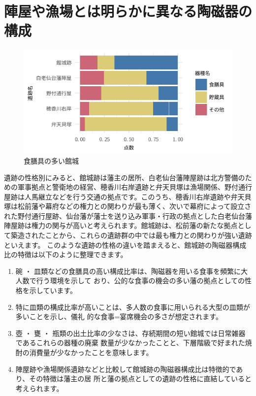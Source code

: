 \documentclass[11pt,report]{jsbook}
\begin{document}
\section{陣屋や漁場とは明らかに異なる陶磁器の構成}

\begin{figure}
\vspace*{-\intextsep} 
\centering
\includegraphics[width=80truemm]{fig/16.pdf}
\caption{食膳具の多い館城}
\label{fig16}
\end{figure}

遺跡の性格別にみると、館城跡は藩主の居所、白老仙台藩陣屋跡は北方警備のための軍事拠点と警衛地の経営、穂香川右岸遺跡と弁天貝塚は漁場関係、野付通行屋跡は人馬継立などを行う交通の拠点です。このうち、穂香川右岸遺跡や弁天貝塚は松前藩や幕府などの権力との関わりが最も薄く、次いで幕府によって設立された野付通行屋跡、仙台藩が藩士を送り込み軍事・行政の拠点とした白老仙台藩陣屋跡は権力の関与が高いと考えられます。館城跡は、松前藩の新たな拠点として築造されたことから、これらの遺跡群の中では最も権力との関わりが強い遺跡といえます。
このような遺跡の性格の違いを踏まえると、館城跡の陶磁器構成比の特徴は以下のように整理できます。

\begin{enumerate}
\item 碗 ・ 皿類などの食膳具の高い構成比率は、陶磁器を用いる食事を頻繁に大人数で行う環境を示して
おり、公的な食事の機会の多い藩の拠点としての性格を示しています。
\item 特に皿類の構成比率が高いことは、多人数の食事に用いられる大型の皿類が多いことを示し、儀礼
的な食事=宴席機会の多さが想定されます。
\item 壺 ・ 甕 ・ 瓶類の出土比率の少なさは、存続期間の短い館城では日常雑器であるこれらの器種の廃棄
数量が少なかったことと、下層階級で好まれた焼酎の消費量が少なかったことを意味します。
\item 陣屋跡や漁場関係遺跡などと比較して館城跡の陶磁器構成比は特徴的であり、その特徴は藩主の居
所と藩の拠点としての遺跡の性格に直結していると考えられます。
\end{enumerate}
\end{document}
